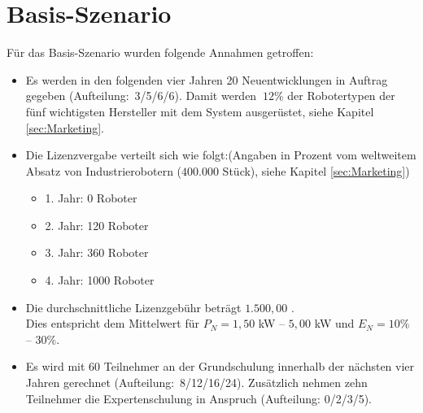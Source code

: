 \section{Basis-Szenario}
Für das Basis-Szenario wurden folgende Annahmen getroffen:
\begin{itemize}
	\item Es werden in den folgenden vier Jahren 20 Neuentwicklungen in Auftrag gegeben (Aufteilung:~3/5/6/6). Damit werden $~12$\% der Robotertypen der fünf wichtigsten Hersteller mit dem System ausgerüstet, siehe Kapitel \ref{sec:Marketing}.
	\item Die Lizenzvergabe verteilt sich wie folgt:\newline (Angaben in Prozent vom weltweitem Absatz von Industrierobotern ($400.000$ Stück), siehe Kapitel \ref{sec:Marketing})
	\begin{itemize}
		\item 1. Jahr: 0 Roboter
		\item 2. Jahr: 120 Roboter
		\item 3. Jahr: 360 Roboter
		\item 4. Jahr: 1000 Roboter
	\end{itemize}
	\item Die durchschnittliche Lizenzgebühr beträgt $1.500,00$ \officialeuro.\\ Dies entspricht dem Mittelwert für $P_N = 1,50$ kW -- $5,00$ kW und $E_N = 10$\% -- $30$\%.
	\item Es wird mit 60 Teilnehmer an der Grundschulung innerhalb der nächsten vier Jahren gerechnet (Aufteilung:~8/12/16/24). Zusätzlich nehmen zehn Teilnehmer die Expertenschulung in Anspruch (Aufteilung: 0/2/3/5).
\end{itemize}

\newpage
